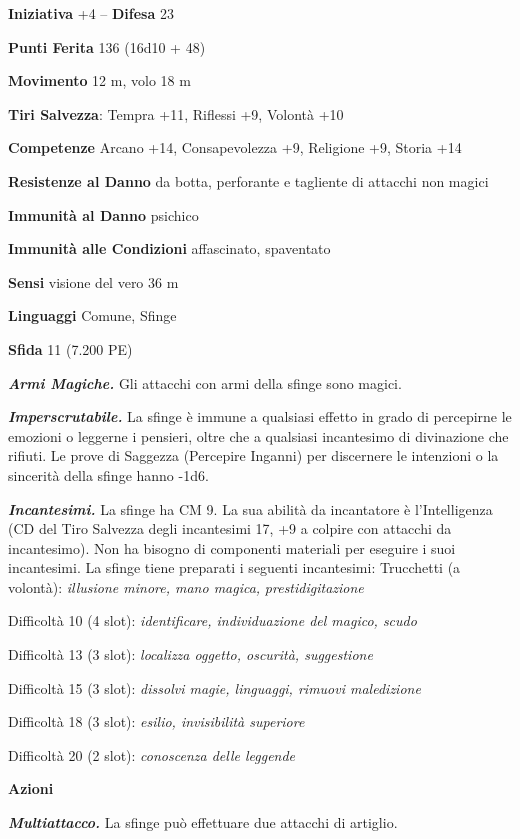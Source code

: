 \begin{multicols}{2}
\textbf{Iniziativa} +4 -- \textbf{Difesa} 23

\textbf{Punti Ferita} 136 (16d10 + 48)

\textbf{Movimento} 12 m, volo 18 m

\textbf{Tiri Salvezza}: Tempra +11, Riflessi +9, Volontà +10

\textbf{Competenze} Arcano +14, Consapevolezza +9, Religione +9, Storia +14

\textbf{Resistenze al Danno} da botta, perforante e tagliente di attacchi non magici

\textbf{Immunità al Danno} psichico

\textbf{Immunità alle Condizioni} affascinato, spaventato 

\textbf{Sensi} visione del vero 36 m

\textbf{Linguaggi} Comune, Sfinge

\textbf{Sfida} 11 (7.200 PE)

\emph{\textbf{Armi Magiche.}} Gli attacchi con armi della sfinge sono
magici.

\emph{\textbf{Imperscrutabile.}} La sfinge è immune a qualsiasi effetto in grado di percepirne le emozioni o leggerne i pensieri, oltre che a qualsiasi incantesimo di divinazione che rifiuti. Le prove di Saggezza (Percepire Inganni) per discernere le intenzioni o la sincerità della sfinge hanno -1d6.

\emph{\textbf{Incantesimi.}} La sfinge ha CM 9. La sua abilità da incantatore è l'Intelligenza (CD del Tiro Salvezza degli incantesimi 17, +9 a colpire con attacchi da incantesimo). Non ha bisogno di componenti materiali per eseguire i suoi incantesimi. La sfinge tiene preparati i seguenti incantesimi: Trucchetti (a volontà): \emph{illusione minore, mano magica,} \emph{prestidigitazione}

Difficoltà 10 (4 slot): \emph{identificare, individuazione del magico, scudo}

Difficoltà 13 (3 slot): \emph{localizza oggetto, oscurità, suggestione} 

Difficoltà 15 (3 slot): \emph{dissolvi magie, linguaggi, rimuovi maledizione}

Difficoltà 18 (3 slot): \emph{esilio, invisibilità superiore}

Difficoltà 20 (2 slot): \emph{conoscenza delle leggende}

\textbf{Azioni}

\emph{\textbf{Multiattacco.}} La sfinge può effettuare due attacchi di artiglio.


\end{multicols}
